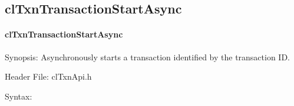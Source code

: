 \begin{flushleft}
\subsection{clTxnTransactionStartAsync}
\hypertarget{pagetxn106}{}\paragraph{cl\-Txn\-Transaction\-Start\-Async}\label{pagetxn106}
\begin{Desc}
\item[Synopsis:]Asynchronously starts a transaction identified by the transaction ID.\end{Desc}
\begin{Desc}
\item[Header File:]clTxnApi.h\end{Desc}
\begin{Desc}
\item[Syntax:]


\end{Desc}
\end{flushleft}
